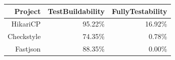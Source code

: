 \begin{figure}[!htb]
\begin{minipage}{.5\linewidth}
        \label{fig:hikari}
    \end{minipage}%
    \begin{minipage}{.5\linewidth}
        \centering
        \begin{tabular}{|r|r|r|}
        \hline
        \textbf{Project} & \textbf{TestBuildability} & \textbf{FullyTestability} \\ \hline
        HikariCP         & 95.22\%                      & 16.92\%                      \\ \hline
        Checkstyle       & 74.35\%                      & 0.78\%                      \\ \hline
        Fastjson         & 88.35\%                      & 0.00\%                      \\ \hline
        \end{tabular}
        \vspace*{0.5cm}
        \label{table:projects-2}
    \end{minipage} 
\end{figure}


